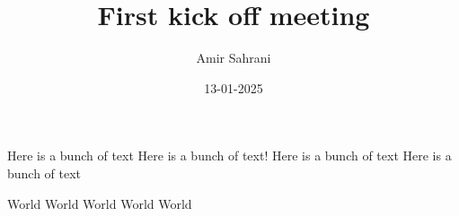 \documentclass[10pt,dvipsnames]{beamer}
\title{First kick off meeting}
\author{Amir Sahrani}
\date{13-01-2025}
\begin{document}
\begingroup
{} %
\frame[plain, s]{\titlepage} %
\endgroup

\begin{frame}
	Here is a bunch of text
	Here is a bunch of text!
	Here is a bunch of text
	Here is a bunch of text

\end{frame}

\begin{frame}
	World
	World
	World
	World
	World
\end{frame}
\end{document}
